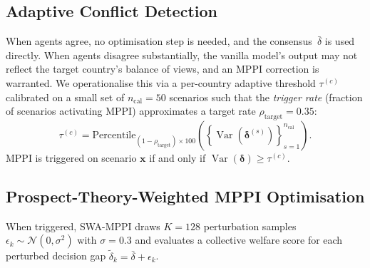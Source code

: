 \documentclass{article}
\begin{document}
\subsection{Adaptive Conflict Detection}
\label{sec:method:tau}

When agents agree, no optimisation step is needed, and the consensus~$\bar\delta$
is used directly. When agents disagree substantially, the vanilla model's output
may not reflect the target country's balance of views, and an MPPI correction is
warranted. We operationalise this via a per-country adaptive threshold $\tau^{(c)}$
calibrated on a small set of $n_\text{cal} = 50$ scenarios such that the \emph{trigger
rate} (fraction of scenarios activating MPPI) approximates a target rate
$\rho_\text{target} = 0.35$:
\begin{equation}
    \tau^{(c)} = \text{Percentile}_{(1-\rho_\text{target})\times 100}
    \!\left(\left\{\operatorname{Var}(\boldsymbol\delta^{(s)})\right\}_{s=1}^{n_\text{cal}}\right).
    \label{eq:tau_calibration}
\end{equation}
MPPI is triggered on scenario $\mathbf{x}$ if and only if
$\operatorname{Var}(\boldsymbol\delta) \geq \tau^{(c)}$.

\subsection{Prospect-Theory-Weighted MPPI Optimisation}
\label{sec:method:mppi}

When triggered, SWA-MPPI draws $K = 128$ perturbation samples
$\epsilon_k \sim \mathcal{N}(0, \sigma^2)$ with $\sigma = 0.3$ and
evaluates a collective welfare score for each perturbed decision gap
$\tilde\delta_k = \bar\delta + \epsilon_k$.
\end{document}

